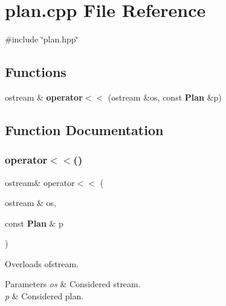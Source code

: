 \section{plan.\+cpp File Reference}
\label{plan_8cpp}
{\ttfamily \#include \char`\"{}plan.\+hpp\char`\"{}}\newline
\subsection*{Functions}
\begin{DoxyCompactItemize}
\item 
ostream \& \textbf{ operator$<$$<$} (ostream \&os, const \textbf{ Plan} \&p)
\end{DoxyCompactItemize}


\subsection{Function Documentation}
\mbox{\label{plan_8cpp_a4eda604d918a9f8e6854b714f3cdee5f}} 
\subsubsection{operator$<$$<$()}
{\footnotesize\ttfamily ostream\& operator$<$$<$ (\begin{DoxyParamCaption}\item[{ostream \&}]{os,  }\item[{const \textbf{ Plan} \&}]{p }\end{DoxyParamCaption})}

Overloads ofstream.


\begin{DoxyParams}{Parameters}
{\em os} & Considered stream. \\
\hline
{\em p} & Considered plan. \\
\hline
\end{DoxyParams}

